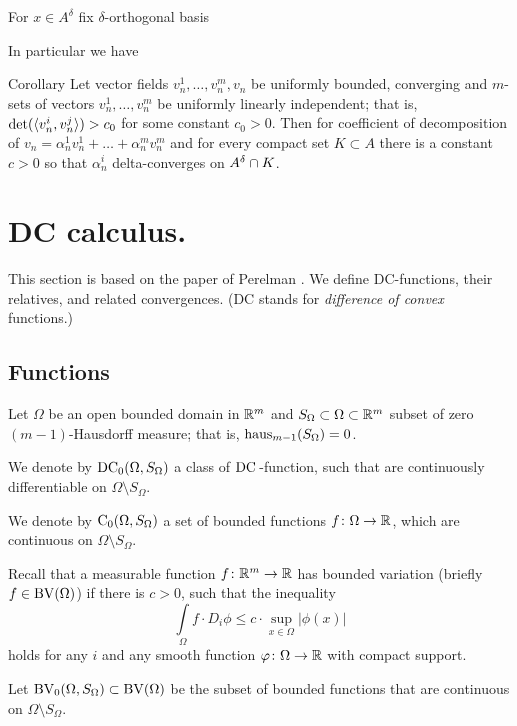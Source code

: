 For $x\in A^\delta$ fix $\delta$-orthogonal basis





In particular we have
\begin{thm}{Corollary}\label{cor:cdeltacoeff}
Let vector fields $v_n^1,\dots, v_n^m, v_n$ be
uniformly bounded, converging
 and $m$-sets of vectors
$v_n^1,\dots, v_n^m$ be uniformly linearly independent;
that is, $\det(\langle v_n^i, v_n^j\rangle)>c_0$
for some constant $c_0>0$.
Then for coefficient of decomposition
of $v_n=\alpha_n^1 v_n^1+\dots+\alpha_n^m v_n^m$
 and for every compact
set $K\subset A$ there is a constant $c>0$ so that
$\alpha_n^i$ delta-converges on $A^\delta\cap K$.
\end{thm}

\section{DC calculus.}\label{sec:DC}

This section is based on the paper of Perelman \cite{PerDC}.
We define DC-functions, their relatives, and related convergences.
(DC stands for \emph{difference of convex} functions.)

\subsection{Functions}

Let $\Omega$ be an open bounded domain in $\mathbb{R}^m$
and $S_\Omega\subset\Omega\subset\mathbb{R}^m $ subset of
zero $(m-1)$-Hausdorff measure; that is, $\operatorname{\rm haus}_{m-1}(S_\Omega)=0$.

We denote by  $\operatorname{DC_0}(\Omega,S_\Omega)$ a class of
 $\mathrm{DC\,}$-function, such  that are continuously differentiable on
$\Omega\setminus S_\Omega$.

We denote by $\operatorname{C_0}(\Omega,S_\Omega)$ a set of bounded functions
$f\colon\Omega\to\mathbb{R}$, which are continuous on $\Omega\setminus S_\Omega$.

Recall that a measurable function $f\colon\mathbb{R}^m\to \mathbb{R}$ has bounded variation
 (briefly $f\in\operatorname{BV}(\Omega)$) if there is  $c>0$,
such that  the inequality
$$\int\limits_\Omega f\cdot D_i\phi
\le
 c\cdot\sup_{x\in\Omega}|\phi(x)|$$
holds
for any $i$ and any smooth function $\varphi\colon\Omega\to \mathbb{R}$ with compact support.

Let $\operatorname{BV_0}(\Omega,S_\Omega)\subset \operatorname{BV}(\Omega)$ be the subset of bounded functions that are continuous on $\Omega\setminus S_\Omega$.



